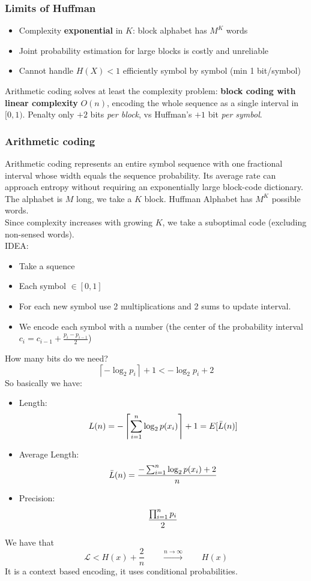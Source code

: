 \subsubsection{Limits of Huffman}
\begin{itemize}
    \item Complexity \textbf{exponential} in $K$: block alphabet has $M^K$ words
    \item Joint probability estimation for large blocks is costly and unreliable
    \item Cannot handle $H(X) < 1$ efficiently symbol by symbol (min 1 bit/symbol)
\end{itemize}
Arithmetic coding solves at least the complexity problem: \textbf{block coding with linear complexity} $O(n)$, encoding the whole sequence as a single interval in $[0,1)$. Penalty only $+2$ bits \emph{per block}, vs Huffman's $+1$ bit \emph{per symbol}.
\subsubsection{Arithmetic coding}
Arithmetic coding represents an entire symbol sequence with one fractional interval whose width equals the sequence probability. Its average rate can approach entropy without requiring an exponentially large block-code dictionary.
The alphabet is $M$ long, we take a $K$ block. Huffman Alphabet has $M^K$ possible words.\\
Since complexity increases with growing $K$, we take a suboptimal code (excluding non-sensed words).\\
IDEA:
\begin{itemize}
    \item Take a squence
    \item Each symbol $\in [0,1]$
    \item For each new symbol use 2 multiplications and 2 sums to update interval.
    \item We encode each symbol with a number (the center of the probability interval $c_i = c_{i-1} + \frac{p_{i} - p_{i-1}}{2}$)
\end{itemize}
How many bits do we need? %
$$\left\lceil-\log_2 p_i\right\rceil+1 < -\log_2 p_i+2$$
So basically we have:
\begin{itemize}
    \item Length:
    $$L(n) = -\left\lceil\sr{n}{i=1}\log_2 p(x_i)\right\rceil + 1 = E[\bar{L}(n)]$$
    \item Average Length: 
    $$\bar{L}(n) = \frac{-\sr{n}{i=1}\log_2 p(x_i) + 2}{n}$$
    \item Precision:
    $$\frac{\pr{n}{i=1}p_i}{2}$$
\end{itemize}
We have that
$$\mathcal{L} < H(x) + \frac{2}{n} \qquad \stackrel{n\to\infty}{\longrightarrow}\qquad H(x)$$
It is a context based encoding, it uses conditional probabilities.
